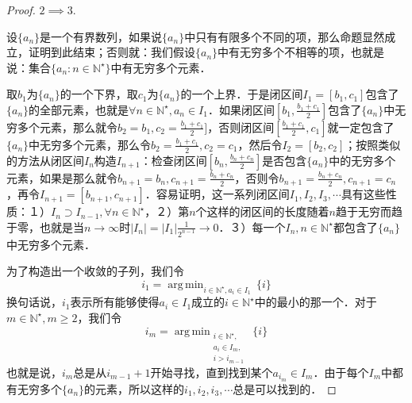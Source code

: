 \documentclass{ctexart}
\theoremstyle{definition}
\theoremstyle{definition}
\theoremstyle{plain}
\theoremstyle{plain}
\theoremstyle{plain}
\theoremstyle{definition}
\DeclareMathOperator*{\argminA}{\mathrm{arg} \,\mathrm{min}}
\newcommand{\nat}{\mathbb{N}^\star}
\begin{document}
\begin{proof}
$2 \implies 3$.

\noindent 设$\{a_n\}$是一个有界数列，如果说$\{a_n\}$中只有有限多个不同的项，那么命题显然成立，证明到此结束；否则就：我们假设$\{a_n\}$中有无穷多个不相等的项，也就是说：集合$\{a_n:n\in\nat\}$中有无穷多个元素．

\noindent 取$b_1$为$\{a_n\}$的一个下界，取$c_1$为$\{a_n\}$的一个上界．于是闭区间$I_1 = [b_1,c_1]$包含了$\{a_n\}$的全部元素，也就是$\forall n \in \nat, a_n \in I_1$．如果闭区间$[b_1,\displaystyle\frac{b_1+c_1}{2}]$包含了$\{a_n\}$中无穷多个元素，那么就令$b_2 = b_1,c_2=\displaystyle\frac{b_1+c_1}{2}]$，否则闭区间$[\displaystyle\frac{b_1+c_1}{2},c_1]$就一定包含了$\{a_n\}$中无穷多个元素，那么令$b_2=\displaystyle\frac{b_1+c_1}{2},c_2=c_1$，然后令$I_2=[b_2,c_2]$；按照类似的方法从闭区间$I_n$构造$I_{n+1}$：检查闭区间$[b_n,\displaystyle\frac{b_n+c_n}{2}]$是否包含$\{a_n\}$中的无穷多个元素，如果是那么就令$b_{n+1}=b_n,c_{n+1}=\displaystyle\frac{b_n+c_n}{2}$，否则令$b_{n+1}=\displaystyle\frac{b_n+c_n}{2},c_{n+1}=c_n$，再令$I_{n+1}=[b_{n+1},c_{n+1}]$．容易证明，这一系列闭区间$I_1,I_2,I_3,\cdots$具有这些性质：１）$I_n \supset I_{n-1}, \forall n \in \nat$，２）第$n$个这样的闭区间的长度随着$n$趋于无穷而趋于零，也就是当$n\to\infty$时$|I_n|=|I_1|\displaystyle\frac{1}{2^{n-1}}\to 0$．３）每一个$I_n, n\in\nat$都包含了$\{a_n\}$中无穷多个元素．

\noindent 为了构造出一个收敛的子列，我们令
\begin{equation}
    i_1 = \argminA_{i \in \nat, a_i \in I_1} \, \{ i \}
\end{equation}
换句话说，$i_1$表示所有能够使得$a_{i} \in I_1$成立的$i \in \nat$中的最小的那一个．对于$m \in \nat, m \geq 2$，我们令
\begin{equation}
    i_m = \argminA_{\substack{i \in \nat, \\ a_i \in I_m, \\ i > i_{m-1} }} \, \{ i \}
\end{equation}
也就是说，$i_m$总是从$i_{m-1}+1$开始寻找，直到找到某个$a_{i_m} \in I_m$．由于每个$I_m$中都有无穷多个$\{a_n\}$的元素，所以这样的$i_1, i_2, i_3, \cdots$总是可以找到的．


\end{proof}
\end{document}
